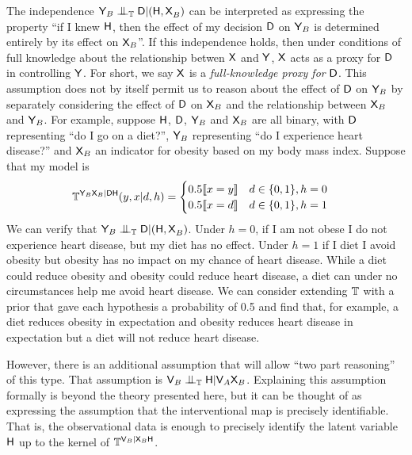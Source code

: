 The independence $\RV{Y}_{B}\CI_{\model{T}} \RV{D}|(\RV{H,X}_B)$ can be interpreted as expressing the property ``if I knew $\mathsf{H}$, then the effect of my decision $\mathsf{D}$ on $\mathsf{Y}_B$ is determined entirely by its effect on $\mathsf{X}_B$''. If this independence holds, then under conditions of full knowledge about the relationship betwen $\mathsf{X}$ and $\mathsf{Y}$, $\mathsf{X}$ acts as a proxy for $\mathsf{D}$ in controlling $\mathsf{Y}$. For short, we say $\mathsf{X}$ is a \emph{full-knowledge proxy for }$\mathsf{D}$. This assumption does not by itself permit us to reason about the effect of $\mathsf{D}$ on $\mathsf{Y}_B$ by separately considering the effect of $\mathsf{D}$ on $\mathsf{X}_B$ and the relationship between $\mathsf{X}_B$ and $\mathsf{Y}_B$. For example, suppose $\mathsf{H}$, $\mathsf{D}$, $\mathsf{Y}_B$ and $\mathsf{X}_B$ are all binary, with $\mathsf{D}$ representing ``do I go on a diet?'', $\mathsf{Y}_B$ representing ``do I experience heart disease?'' and $\mathsf{X}_B$ an indicator for obesity based on my body mass index. Suppose that my model is
\begin{align}
    \mathbb{T}^{\mathsf{Y}_B\mathsf{X}_B|\mathsf{D}\mathsf{H}}(y,x|d,h) &= \begin{cases}
        0.5\llbracket x=y\rrbracket & d\in\{0,1\},h=0\\
        0.5\llbracket x = d \rrbracket & d\in \{0,1\},h=1
    \end{cases}
\end{align}
We can verify that $\RV{Y}_{B}\CI_{\model{T}} \RV{D}|(\RV{H,X}_B)$. Under $h=0$, if I am not obese I do not experience heart disease, but my diet has no effect. Under $h=1$ if I diet I avoid obesity but obesity has no impact on my chance of heart disease. While a diet could reduce obesity and obesity could reduce heart disease, a diet can under no circumstances help me avoid heart disease. We can consider extending $\mathbb{T}$ with a prior that gave each hypothesis a probability of 0.5 and find that, for example, a diet reduces obesity in expectation and obesity reduces heart disease in expectation but a diet will not reduce heart disease.

However, there is an additional assumption that will allow ``two part reasoning'' of this type. That assumption is $\RV{V}_B\CI_{\model{T}}\RV{H}|\RV{V}_A\RV{X}_B$. Explaining this assumption formally is beyond the theory presented here, but it can be thought of as expressing the assumption that the interventional map is precisely identifiable. That is, the observational data is enough to precisely identify the latent variable $\mathsf{H}$ up to the kernel of $\mathbb{T}^{\mathsf{V}_B|\mathsf{X}_B\mathsf{H}}$.

